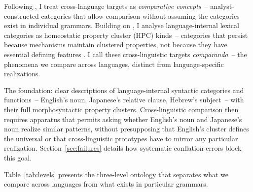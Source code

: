 \documentclass[12pt]{article}
\begin{document}
Following \textcite{Haspelmath2010}, I treat cross-language targets as \emph{comparative concepts}~-- analyst-constructed categories that allow comparison without assuming the categories exist in individual grammars. Building on \textcite{Croft2001,HuddlestonPullum2002}, I analyse language-internal lexical categories as homeostatic property cluster (HPC) kinds~-- categories that persist because mechanisms maintain clustered properties, not because they have essential defining features \parencite{Boyd1991Enthusiasm,Boyd1999Homeostasis,Khalidi2013}. I call these cross-linguistic targets \emph{comparanda}~-- the phenomena we compare across languages, distinct from language-specific realizations.

The foundation: clear descriptions of language-internal syntactic categories and functions~-- English's noun, Japanese's relative clause, Hebrew's subject~-- with their full morphosyntactic property clusters. Cross-linguistic comparison then requires apparatus that permits asking whether English's noun and Japanese's noun realize similar patterns, without presupposing that English's cluster defines the universal or that cross-linguistic prototypes have to mirror any particular realization. Section~\ref{sec:failures} details how systematic conflation errors block this goal.


Table~\ref{tab:levels} presents the three-level ontology that separates what we compare across languages from what exists in particular grammars.
\end{document}
